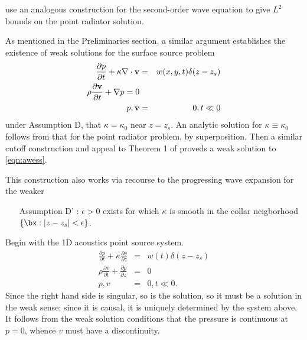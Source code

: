 \cite{SantosaSymes:00} use an analogous construction for the
second-order wave equation to give $L^2$ bounds on the point radiator
solution.

As mentioned in the Preliminaries section, a similar argument
establishes the existence of weak solutions for the surface source problem
\begin{eqnarray}
\label{eqn:awess}
\frac{\partial p}{\partial t} + \kappa \nabla \cdot {\bf v} &=&
                                                                w(x,y,t)\delta(z-z_s) \nonumber\\
\rho \frac{\partial {\bf v}}{\partial t} + \nabla p = 0 \nonumber\\
p,{\bf v}&=&0, t \ll 0
\end{eqnarray}
under Assumption D, that $\kappa=\kappa_0$ near $z=z_s$. An analytic
solution for $\kappa \equiv \kappa_0$ follows from that for the point
radiator problem, by superposition. Then a similar cutoff construction
and appeal to Theorem 1 of \cite{BlazekStolkSymes:13} proveds a weak
solution to \ref{eqn:awess}.

This construction also works via recourse to the progressing wave
expansion for the weaker
\begin{itemize}
\item[Assumption D']: $\epsilon > 0$ exists for which $\kappa$ is
smooth in the collar neigborhood $\{\bx: |z-z_s|<\epsilon\}$.
\end{itemize}
  
Begin with the 1D acoustics point source system. 
\begin{eqnarray}
\label{eqn:awe1d}
\frac{\partial p}{\partial t} +\kappa\frac{\partial 
  v}{\partial z} &=& w(t)\delta(z-z_s) \nonumber\\
\rho \frac{\partial v}{\partial t} + \frac{\partial p}{\partial 
  z}&=&0\nonumber\\
 p,v&=&0, t \ll 0. 
\end{eqnarray}
Since the right hand side is singular, so is the solution, so it must
be a solution in the weak sense; since it is causal, it is uniquely
determined by the system above. It follows from the weak solution
conditions that the pressure is continuous at $p=0$, whence $v$ must
have a discontinuity. 

